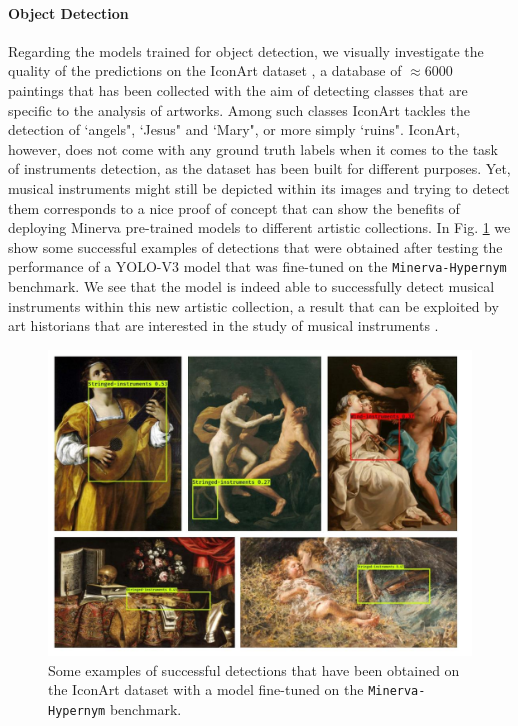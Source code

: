\paragraph{Object Detection}
Regarding the models trained for object detection, we visually investigate the quality of the predictions on the IconArt dataset \cite{gonthier2018weakly}, a database of $\approx 6000$ paintings that has been collected with the aim of detecting classes that are specific to the analysis of artworks. Among such classes IconArt tackles the detection of `angels", `Jesus" and `Mary", or more simply `ruins". IconArt, however, does not come with any ground truth labels when it comes to the task of instruments detection, as the dataset has been built for different purposes. Yet, musical instruments might still be depicted within its images and trying to detect them corresponds to a nice proof of concept that can show the benefits of deploying Minerva pre-trained models to different artistic collections. In Fig. \ref{fig:wikiart_detections} we show some successful examples of detections that were obtained after testing the performance of a YOLO-V3 model that was fine-tuned on the \texttt{Minerva-Hypernym} benchmark. We see that the model is indeed able to successfully detect musical instruments within this new artistic collection, a result that can be exploited by art historians that are interested in the study of musical instruments .   

\begin{figure}[ht!]
\centering
  \includegraphics[width=\linewidth]{./Images/Chapter05/wikiart_detections}
  \caption{Some examples of successful detections that have been obtained on the IconArt dataset with a model fine-tuned on the \texttt{Minerva-Hypernym} benchmark.}
  \label{fig:wikiart_detections}
\end{figure}

